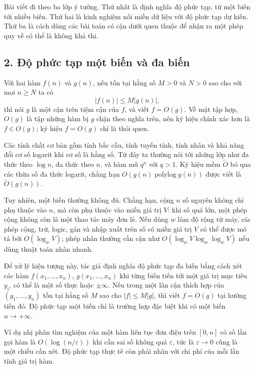 \documentclass[11pt]{article}
\begin{document}
Bài viết đi theo ba lớp ý tưởng. Thứ nhất là định nghĩa độ phức tạp, từ một
biến tới nhiều biến. Thứ hai là kinh nghiệm nối miền dữ liệu với độ phức tạp
dự kiến. Thứ ba là cách dùng các bài toán có cận dưới quen thuộc để nhận ra
một phép quy về có thể là không khả thi.

\subsection*{2. Độ phức tạp một biến và đa biến}

Với hai hàm \(f(n)\) và \(g(n)\), nếu tồn tại hằng số \(M>0\) và \(N>0\) sao
cho với mọi \(n\ge N\) ta có
\[
  |f(n)|\le M|g(n)|,
\]
thì nói \(g\) là một cận trên tiệm cận của \(f\), và viết \(f=O(g)\). Về mặt
tập hợp, \(O(g)\) là tập những hàm bị \(g\) chặn theo nghĩa trên, nên ký hiệu
chính xác hơn là \(f\in O(g)\); ký hiệu \(f=O(g)\) chỉ là thói quen.

Các tính chất cơ bản gồm tính bắc cầu, tính tuyến tính, tính nhân và khả năng
đổi cơ số logarit khi cơ số là hằng số. Từ đây ta thường nói tới những lớp như
đa thức theo \(\log n\), đa thức theo \(n\), và hàm mũ \(q^n\) với \(q>1\).
Ký hiệu mềm \(\widetilde O\) bỏ qua các thừa số đa thức logarit, chẳng hạn
\(O(g(n)\operatorname{polylog} g(n))\) được viết là \(\widetilde O(g(n))\).

Tuy nhiên, một biến thường không đủ. Chẳng hạn, cộng \(n\) số nguyên không chỉ
phụ thuộc vào \(n\), mà còn phụ thuộc vào miền giá trị \(V\): khi số quá lớn,
một phép cộng không còn là một thao tác máy đơn lẻ. Nếu dùng \(w\) làm độ rộng
từ máy, các phép cộng, trừ, logic, gán và nhập xuất trên số có miền giá trị
\(V\) có thể được mô tả bởi \(O(\log_w V)\); phép nhân thường cần cận như
\(O(\log_w V\log_w\log_w V)\) nếu dùng thuật toán nhân nhanh.

Để xử lý hiện tượng này, tác giả định nghĩa độ phức tạp đa biến bằng cách xét
các hàm \(f(x_1,\ldots,x_n)\), \(g(x_1,\ldots,x_n)\) khi từng biến tiến tới
một giá trị mục tiêu \(y_i\), có thể là một số thực hoặc \(\pm\infty\). Nếu
trong một lân cận thích hợp của \((y_1,\ldots,y_n)\) tồn tại hằng số \(M\) sao
cho \(|f|\le M|g|\), thì viết \(f=O(g)\) tại hướng tiến đó. Độ phức tạp một
biến chỉ là trường hợp đặc biệt khi có một biến \(n\to+\infty\).

Ví dụ nhị phân tìm nghiệm của một hàm liên tục đơn điệu trên \([0,n]\) có số
lần gọi hàm là \(O(\log(n/\varepsilon))\) khi cần sai số không quá
\(\varepsilon\), tức là \(\varepsilon\to0\) cũng là một chiều cần xét. Độ phức
tạp thực tế còn phải nhân với chi phí của mỗi lần tính giá trị hàm.
\end{document}

